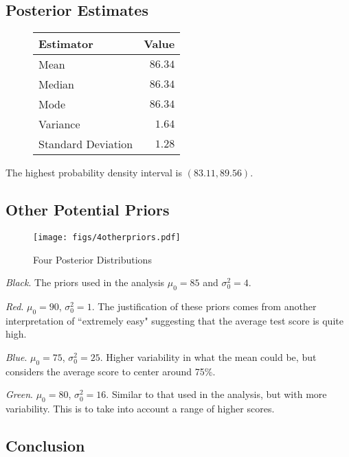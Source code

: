 \documentclass[12pt]{article}
\begin{document}
\subsection{Posterior Estimates}

\begin{figure}[H]
\begin{center}
\begin{tabular}{l|r}
Estimator & \multicolumn{1}{l}{Value} \\ \hline \hline
Mean               & $86.34$ \\
Median             & $86.34$ \\
Mode               & $86.34$ \\
Variance           & $1.64$ \\
Standard Deviation & $1.28$ \\
\end{tabular}
\end{center}
\end{figure}

\noindent The highest probability density interval is $(83.11, 89.56)$.


\subsection{Other Potential Priors}

\begin{figure}[H]
\begin{center}
\texttt{[image: figs/4otherpriors.pdf]}
\caption{Four Posterior Distributions}
\end{center}
\end{figure}

\noindent \textit{Black}.  The priors used in the analysis $\mu_0=85$ and $\sigma_0^2=4$.

\noindent \textit{Red}. $\mu_0=90$, $\sigma_0^2=1$.  The justification of these priors comes from another interpretation of ``extremely easy" suggesting that the average test score is quite high.

\noindent \textit{Blue}. $\mu_0=75$, $\sigma_0^2=25$.  Higher variability in what the mean could be, but considers the average score to center around 75\%.

\noindent \textit{Green}. $\mu_0=80$, $\sigma_0^2=16$.  Similar to that used in the analysis, but with more variability.  This is to take into account a range of higher scores.

\subsection{Conclusion}
\end{document}
